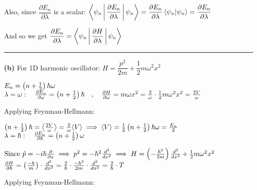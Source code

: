 \documentclass[14pt]{extarticle}
\makeatletter
\newenvironment{lefteqs}{%
    \begin{flushleft}%
    \renewcommand{\arraystretch}{1.3}%
    $\begin{array}{@{}l@{}}%
}{%
    \end{array}$%
    \end{flushleft}%
}
\makeatother
\begin{document}
Also, since $\dfrac{\partial E_n}{\partial \lambda}$ is a scalar: $\Braket{\psi_n | \dfrac{\partial E_n}{\partial \lambda} | \psi_n} = \dfrac{\partial E_n}{\partial \lambda} \braket{\psi_n | \psi_n} = \dfrac{\partial E_n}{\partial \lambda}$

And so we get $\dfrac{\partial E_n}{\partial \lambda} = \Braket{\psi_n | \dfrac{\partial H}{\partial \lambda} | \psi_n}$

\vspace{3em}
\hrule
\vspace{2em}

\textbf{(b)}
For 1D harmonic oscillator: $H = \dfrac{p^2}{2m} + \dfrac{1}{2} m \omega^2 x^2$

\begin{lefteqs}
    E_n = \left( n + \frac{1}{2} \right) \hbar \omega \\
    \lambda = \omega : \quad \frac{\partial E_n}{\partial \omega} = \left( n + \frac{1}{2} \right) \hbar
    \quad , \quad
    \frac{\partial H}{\partial \omega} = m \omega x^2 = \frac{2}{\omega} \cdot \frac{1}{2} m \omega^2 x^2 = \frac{2V}{\omega}
\end{lefteqs}

Applying Feynman-Hellmann:

\begin{lefteqs}
    \left( n + \frac{1}{2} \right) \hbar = \left\langle \frac{2V}{\omega} \right\rangle = \frac{2}{\omega} \langle V \rangle
    \implies \langle V \rangle = \frac{1}{2} \left( n + \frac{1}{2} \right) \hbar \omega = \frac{E_n}{2} \\
    \lambda = \hbar : \quad \frac{\partial E_n}{\partial \hbar} = \left( n + \frac{1}{2} \right) \omega
\end{lefteqs}

\begin{lefteqs}
    \text{Since } \hat{p} = -i \hbar \frac{\partial}{\partial x} \implies p^2 = -\hbar^2 \frac{d^2}{dx^2}
    \implies H = \left( -\frac{\hbar^2}{2m} \right) \frac{d^2}{dx^2} + \frac{1}{2} m \omega^2 x^2 \\
    \frac{\partial H}{\partial \hbar} = \left( \frac{-\hbar}{m} \right) \cdot \frac{d^2}{dx^2}
    = \frac{2}{\hbar} \cdot \frac{-\hbar^2}{2m} \cdot \frac{d^2}{dx^2} = \frac{2}{\hbar} \cdot T
\end{lefteqs}

Applying Feynman-Hellmann:
\end{document}
